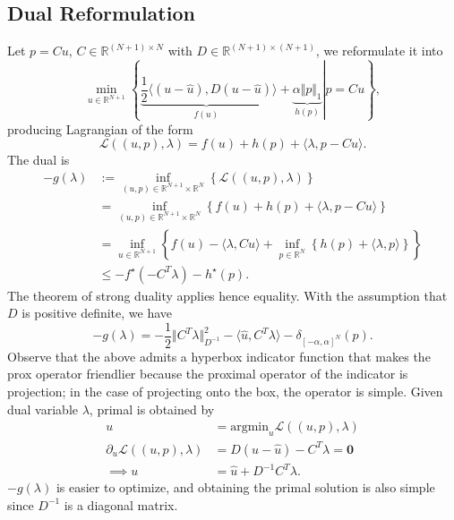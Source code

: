 \documentclass[]{article}
\theoremstyle{definition}
\numberwithin{equation}{subsection}
\begin{document}
    \subsection*{Dual Reformulation}
        Let $p = Cu$, $C\in \mathbb R^{(N + 1)\times N}$ with $D \in \mathbb R^{(N + 1)\times (N + 1)}$, we reformulate it into 
        \[
            \min_{u\in \mathbb R^{N + 1}}     
            \left\lbrace
                \left.
                    \underbrace{\frac{1}{2}\langle (u - \hat u), D(u - \hat u)}_{f(u)}\rangle 
                    + 
                    \underbrace{\alpha \Vert p\Vert_1}_{h(p)}
                \right| 
                p = Cu
            \right\rbrace, 
        \]
        producing Lagrangian of the form 
        \[
            \mathcal L((u, p), \lambda) = 
            f(u) + h(p) + \langle \lambda, p - Cu\rangle. 
        \]
        The dual is
        \begin{align*}
            - g(\lambda) &:= \inf_{(u, p)\in \mathbb R^{N + 1}\times \mathbb R^N}
            \left\lbrace
                \mathcal L({(u, p), \lambda})
            \right\rbrace
            \\
            &= \inf_{(u, p)\in \mathbb R^{N + 1}\times \mathbb R^N}
            \left\lbrace
                f(u) + h(p) + \langle \lambda, p - Cu\rangle
            \right\rbrace
            \\
            &= 
            \inf_{u\in \mathbb R^{N + 1}}
            \left\lbrace
                f(u) - \langle \lambda, Cu\rangle 
                + 
                \inf_{p\in \mathbb R^{N}}
                \left\lbrace
                    h(p) + \langle \lambda, p\rangle  
                \right\rbrace
            \right\rbrace
            \\
            &\le
            -f^\star (-C^T\lambda) - h^\star(p). 
        \end{align*}
        The theorem of strong duality applies hence equality. 
        With the assumption that $D$ is positive definite, we have 
        \[
            - g(\lambda) = -\frac{1}{2}    \Vert C^T\lambda\Vert^2_{D^{-1}} - 
            \langle \hat u, C^T \lambda\rangle - 
            \delta_{[-\alpha, \alpha]^N}(p). 
        \]
        Observe that the above admits a hyperbox indicator function that makes the prox operator friendlier because the proximal operator of the indicator is projection; in the case of projecting onto the box, the operator is simple. 
        Given dual variable $\lambda$, primal is obtained by 
        \begin{align*}
            u &= \text{argmin}_u \mathcal L((u, p), \lambda) 
            \\
            \partial_u \mathcal L((u, p), \lambda) &= D(u - \hat u) - C^T\lambda = \mathbf 0
            \\
            \implies u &= \hat u + D^{-1}C^T\lambda. 
        \end{align*}
        $-g(\lambda)$ is easier to optimize, and obtaining the primal solution is also simple since $D^{-1}$ is a diagonal matrix. 
\end{document}

